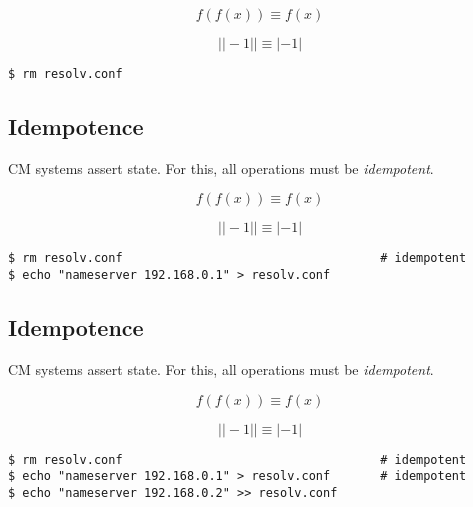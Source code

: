 \documentclass[xga]{xdvislides}
\begin{document}
\begin{displaymath}
f(f(x)) \equiv f(x)
\end{displaymath}

\begin{displaymath}
| |-1| | \equiv |-1|
\end{displaymath}

\begin{verbatim}
$ rm resolv.conf
\end{verbatim}

\subsection{Idempotence}
CM systems assert state.  For this, all operations
must be {\em idempotent}. \\
\vspace{.5in}

\begin{displaymath}
f(f(x)) \equiv f(x)
\end{displaymath}

\begin{displaymath}
| |-1| | \equiv |-1|
\end{displaymath}

\begin{verbatim}
$ rm resolv.conf                                    # idempotent
$ echo "nameserver 192.168.0.1" > resolv.conf
\end{verbatim}

\subsection{Idempotence}
CM systems assert state.  For this, all operations
must be {\em idempotent}. \\
\vspace{.5in}

\begin{displaymath}
f(f(x)) \equiv f(x)
\end{displaymath}

\begin{displaymath}
| |-1| | \equiv |-1|
\end{displaymath}

\begin{verbatim}
$ rm resolv.conf                                    # idempotent
$ echo "nameserver 192.168.0.1" > resolv.conf       # idempotent
$ echo "nameserver 192.168.0.2" >> resolv.conf
\end{verbatim}
\end{document}
